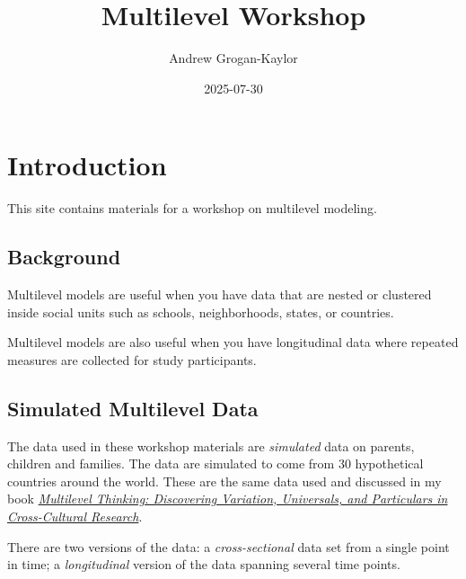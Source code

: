\documentclass[
  letterpaper,
  DIV=11,
  numbers=noendperiod]{scrreprt}
\title{Multilevel Workshop}
\author{Andrew Grogan-Kaylor}
\date{2025-07-30}
\renewcommand*\contentsname{Table of contents}
\newcommand\contentsname{Table of contents}
\begin{document}
\maketitle

\renewcommand*\contentsname{Table of contents}
{
\hypersetup{linkcolor=}
\setcounter{tocdepth}{2}
\tableofcontents
}
\listoffigures
\listoftables


\chapter{Introduction}\label{introduction}

This site contains materials for a workshop on multilevel modeling.

\section{Background}\label{background}

Multilevel models are useful when you have data that are nested or
clustered inside social units such as schools, neighborhoods, states, or
countries.

Multilevel models are also useful when you have longitudinal data where
repeated measures are collected for study participants.

\section{Simulated Multilevel Data}\label{simulated-multilevel-data}

The data used in these workshop materials are \emph{simulated} data on
parents, children and families. The data are simulated to come from 30
hypothetical countries around the world. These are the same data used
and discussed in my book
\emph{\href{https://academic.oup.com/book/60530}{Multilevel Thinking:
Discovering Variation, Universals, and Particulars in Cross-Cultural
Research}}.

There are two versions of the data: a \emph{cross-sectional} data set
from a single point in time; a \emph{longitudinal} version of the data
spanning several time points.
\end{document}
